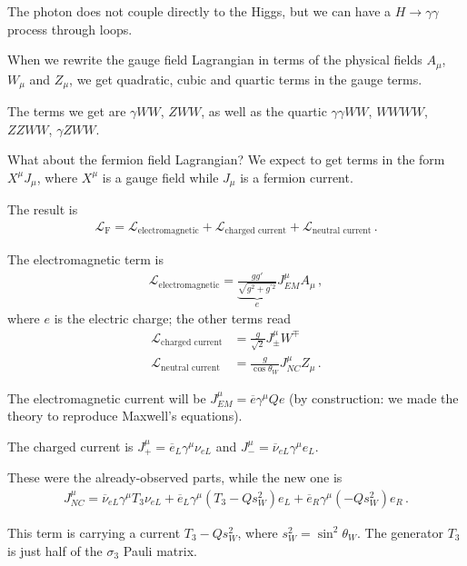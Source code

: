 \documentclass[main.tex]{subfiles}
\begin{document}
The photon does not couple directly to the Higgs, but we can have a \(H \to \gamma \gamma \) process through loops.

When we rewrite the gauge field Lagrangian in terms of the physical fields \(A_\mu \), \(W_\mu \) and \(Z_\mu \), we get quadratic, cubic and quartic terms in the gauge terms. 

The terms we get are \(\gamma WW\), \(Z WW\), as well as the quartic \(\gamma \gamma WW\), \(WWWW\), \(ZZWW\), \(\gamma ZWW\). 

What about the fermion field Lagrangian?
We expect to get terms in the form \(X^{\mu } J_\mu \), where \(X^{\mu }\) is a gauge field while \(J_\mu \) is a fermion current. 

The result is 
%
\begin{align}
\mathscr{L} _{\text{F}} = \mathscr{L} _{\text{electromagnetic}} + \mathscr{L} _{\text{charged current}} + \mathscr{L} _{\text{neutral current}}
\,.
\end{align}

The electromagnetic term is 
%
\begin{align}
\mathscr{L} _{\text{electromagnetic}} = \underbrace{\frac{gg'}{\sqrt{g^2 + g^{\prime 2}}}}_{e} J^{\mu }_{EM} A_\mu 
\,,
\end{align}
%
where \(e\) is the electric charge; the other terms read 
%
\begin{align}
\mathscr{L} _{\text{charged current}} &= \frac{g}{\sqrt{2}} J^{\mu}_{\pm} W^{\mp} \\
\mathscr{L} _{\text{neutral current}} &= \frac{g}{\cos \theta _W} J^{\mu}_{NC} Z_\mu  
\,.
\end{align}

The electromagnetic current will be \(J^{\mu }_{EM} = \overline{e} \gamma^{\mu } Q e\) (by construction: we made the theory to reproduce Maxwell's equations). 

The charged current is \(J^{\mu }_{+} = \overline{e}_L \gamma^{\mu } \nu_{eL}\) and \(J^{\mu }_{-} = \overline{\nu}_{eL} \gamma^{\mu } e_L\). 

These were the already-observed parts, while the new one is 
%
\begin{align}
J^{\mu }_{NC} = \overline{\nu}_{eL} \gamma^{\mu } T_3 \nu_{eL} 
+ \overline{e}_L \gamma^{\mu } \left( T_3 - Q s^2_W  \right) e_L 
+ \overline{e}_R \gamma^{\mu } (-  Q s^2 _W ) e_R
\,.
\end{align}

This term is carrying a current \(T_3 - Q s^2_W\), where \(s^2_W = \sin^2 \theta _W\).
The generator \(T_3\) is just half of the \(\sigma _3\) Pauli matrix. 
\end{document}
